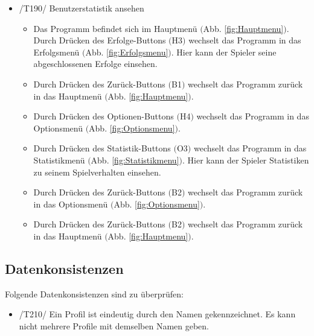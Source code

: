 \begin{itemize}
\item /T190/ Benutzerstatistik ansehen
\begin{itemize}
\item Das Programm befindet sich im Hauptmenü $($Abb. \ref{fig:Hauptmenu}$)$. Durch Drücken des Erfolge-Buttons $($H3$)$ wechselt das Programm in das Erfolgsmenü $($Abb. \ref{fig:Erfolgsmenu}$)$. Hier kann der Spieler seine abgeschlossenen Erfolge einsehen.
\item Durch Drücken des Zurück-Buttons $($B1$)$ wechselt das Programm zurück in das Hauptmenü $($Abb. \ref{fig:Hauptmenu}$)$.
\item Durch Drücken des Optionen-Buttons $($H4$)$ wechselt das Programm in das Optionsmenü $($Abb. \ref{fig:Optionsmenu}$)$.
\item Durch Drücken des Statistik-Buttons $($O3$)$ wechselt das Programm in das Statistikmenü $($Abb. \ref{fig:Statistikmenu}$)$. Hier kann der Spieler Statistiken zu seinem Spielverhalten einsehen.
\item Durch Drücken des Zurück-Buttons $($B2$)$ wechselt das Programm zurück in das Optionsmenü $($Abb. \ref{fig:Optionsmenu}$)$.
\item Durch Drücken des Zurück-Buttons $($B2$)$ wechselt das Programm zurück in das Hauptmenü $($Abb. \ref{fig:Hauptmenu}$)$.
\end{itemize}

\end{itemize}

\subsection{Datenkonsistenzen}
Folgende Datenkonsistenzen sind zu überprüfen:

\begin{itemize}
\item /T210/ Ein Profil ist eindeutig durch den Namen gekennzeichnet. Es kann nicht mehrere Profile mit demselben Namen geben.
\end{itemize}
